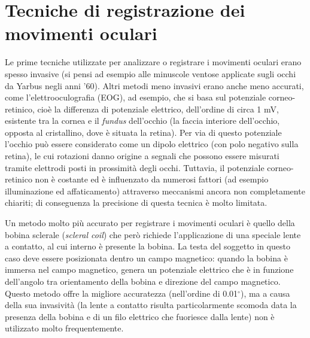 \documentclass[12pt]{article}
\begin{document}
\section{Tecniche di registrazione dei movimenti oculari}
Le prime tecniche utilizzate per analizzare o registrare i movimenti oculari erano spesso invasive (si pensi ad esempio alle minuscole ventose applicate sugli occhi da Yarbus negli anni '60). Altri metodi meno invasivi erano anche meno accurati, come l'elettrooculografia (EOG), ad esempio, che si basa sul potenziale corneo-retinico, cioè la differenza di potenziale elettrico, dell'ordine di circa 1 mV, esistente tra la cornea e il \textit{fundus} dell'occhio (la faccia interiore dell'occhio, opposta al cristallino, dove è situata la retina). Per via di questo potenziale l'occhio può essere considerato come un dipolo elettrico (con polo negativo sulla retina), le cui rotazioni danno origine a segnali che possono essere misurati tramite elettrodi posti in prossimità degli occhi. Tuttavia, il potenziale corneo-retinico non è costante ed è influenzato da numerosi fattori (ad esempio illuminazione ed affaticamento) attraverso meccanismi ancora non completamente chiariti; di conseguenza la precisione di questa tecnica è molto limitata. 

Un metodo molto più accurato per registrare i movimenti oculari è quello della bobina sclerale (\textit{scleral coil}) che però richiede l'applicazione di una speciale lente a contatto, al cui interno è presente la bobina. La testa del soggetto in questo caso deve essere posizionata dentro un campo magnetico: quando la bobina è immersa nel campo magnetico, genera un potenziale elettrico che è in funzione dell'angolo tra orientamento della bobina e direzione del campo magnetico. Questo metodo offre la migliore accuratezza (nell'ordine di 0.01$^{\circ}$), ma a causa della sua invasività (la lente a contatto risulta particolarmente scomoda data la presenza della bobina e di un filo elettrico che fuoriesce dalla lente) non è utilizzato molto frequentemente.
\end{document}
